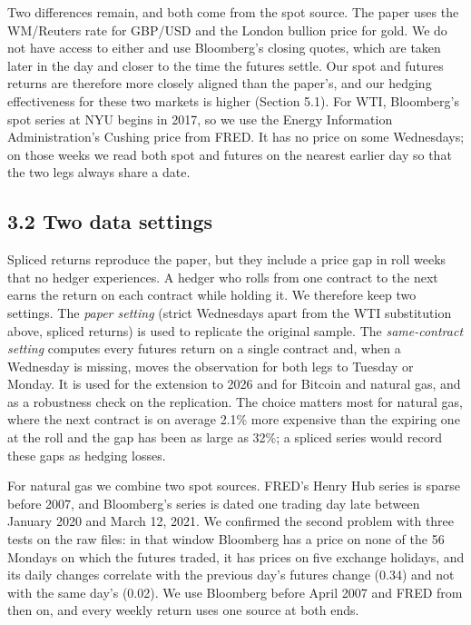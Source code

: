 \documentclass[11pt,letterpaper]{article}
\begin{document}
Two differences remain, and both come from the spot source. The paper uses the WM/Reuters rate for GBP/USD and the London bullion price for gold. We do not have access to either and use Bloomberg's closing quotes, which are taken later in the day and closer to the time the futures settle. Our spot and futures returns are therefore more closely aligned than the paper's, and our hedging effectiveness for these two markets is higher (Section 5.1). For WTI, Bloomberg's spot series at NYU begins in 2017, so we use the Energy Information Administration's Cushing price from FRED. It has no price on some Wednesdays; on those weeks we read both spot and futures on the nearest earlier day so that the two legs always share a date.

\subsection*{3.2 Two data settings}

Spliced returns reproduce the paper, but they include a price gap in roll weeks that no hedger experiences. A hedger who rolls from one contract to the next earns the return on each contract while holding it. We therefore keep two settings. The \textit{paper setting} (strict Wednesdays apart from the WTI substitution above, spliced returns) is used to replicate the original sample. The \textit{same-contract setting} computes every futures return on a single contract and, when a Wednesday is missing, moves the observation for both legs to Tuesday or Monday. It is used for the extension to 2026 and for Bitcoin and natural gas, and as a robustness check on the replication. The choice matters most for natural gas, where the next contract is on average 2.1\% more expensive than the expiring one at the roll and the gap has been as large as 32\%; a spliced series would record these gaps as hedging losses.

For natural gas we combine two spot sources. FRED's Henry Hub series is sparse before 2007, and Bloomberg's series is dated one trading day late between January 2020 and March 12, 2021. We confirmed the second problem with three tests on the raw files: in that window Bloomberg has a price on none of the 56 Mondays on which the futures traded, it has prices on five exchange holidays, and its daily changes correlate with the previous day's futures change (0.34) and not with the same day's (0.02). We use Bloomberg before April 2007 and FRED from then on, and every weekly return uses one source at both ends.
\end{document}
